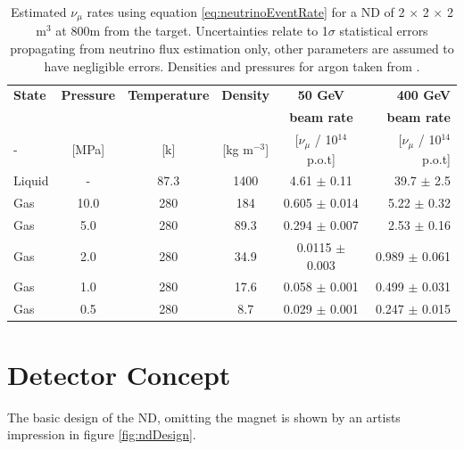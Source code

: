\renewcommand{\arraystretch}{1.5}
\begin{table}
\begin{center}
  \begin{tabular}{l*{4}{c}r}
  \hline
  \textbf{State} &\textbf{Pressure} & \textbf{Temperature} & \textbf{Density} & \textbf{50 GeV} & \textbf{400 GeV} \\
  & & & & \textbf{beam rate} & \textbf{beam rate}\\
  \hline
  - & [MPa] & [k] & [kg m$^{-3}$] & [$\nu_{\mu}$ / 10$^{14}$ p.o.t] & [$\nu_{\mu}$ / 10$^{14}$ p.o.t] \\
  \hline
  \hline
  Liquid & - & 87.3 & 1400 & 4.61 $\pm$ 0.11 & 39.7 $\pm$ 2.5  \\
  Gas & 10.0 & 280 & 184 & 0.605 $\pm$ 0.014  & 5.22 $\pm$ 0.32  \\
  Gas & 5.0 & 280 & 89.3 & 0.294 $\pm$ 0.007  & 2.53 $\pm$ 0.16  \\
  Gas & 2.0 & 280 & 34.9 & 0.0115 $\pm$ 0.003  & 0.989 $\pm$ 0.061 \\
  Gas & 1.0 & 280 & 17.6 & 0.058 $\pm$ 0.001& 0.499 $\pm$ 0.031\\
  Gas & 0.5 & 280 & 8.7 & 0.029 $\pm$ 0.001 & 0.247 $\pm$ 0.015  \\
    \hline
  \end{tabular}
      \caption{Estimated $\nu_{\mu}$ rates using equation \ref{eq:neutrinoEventRate} for a ND of 2 $\times$ 2 $\times$ 2 m$^{3}$ at 800m from the target. Uncertainties relate to 1$\sigma$ statistical errors propagating from neutrino flux estimation only, other parameters are assumed to have negligible errors. Densities and pressures for argon taken from \cite{argonDensities}.}
    \label{tab:gasAndLiquidArgonRates}
\end{center}
    \end{table}
\renewcommand{\arraystretch}{1.0}

\section{Detector Concept}
The basic design of the ND, omitting the magnet is shown by an artists impression in figure \ref{fig:ndDesign}.

